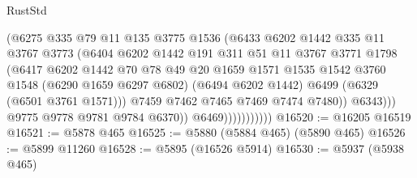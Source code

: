 \begin{lexlean}{RustStd}
\begin{coremodule}
{{                                  (@6275
                                    @335
                                    @79
                                    @11
                                    @135
                                    @3775
                                    @1536
                                    (@6433
                                      @6202
                                      @1442
                                      @335
                                      @11
                                      @3767
                                      @3773
                                      (@6404
                                        @6202
                                        @1442
                                        @191
                                        @311
                                        @51
                                        @11
                                        @3767
                                        @3771
                                        @1798
                                        (@6417
                                          @6202
                                          @1442
                                          @70
                                          @78
                                          @49
                                          @20
                                          @1659
                                          @1571
                                          @1535
                                          @1542
                                          @3760
                                          @1548
                                          (@6290 @1659 @6297 @6802)
                                          (@6494 @6202 @1442)
                                          @6499
                                          (@6329 (@6501 @3761 @1571)))
                                        @7459
                                        @7462
                                        @7465
                                        @7469
                                        @7474
                                        @7480))
                                    @6343)))
                              @9775
                              @9778
                              @9781
                              @9784
                              @6370))
                          @6469)))))))))))
@16520 := @16205 @16519
@16521 := @5878 @465
@16525 := @5880 (@5884 @465) (@5890 @465)
@16526 := @5899 @11260
@16528 := @5895 (@16526 @5914)
@16530 := @5937 (@5938 @465)
}}
\end{coremodule}
\end{lexlean}
